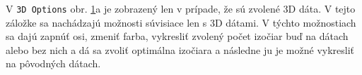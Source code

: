\documentclass[a4paper,11pt,oneside]{article}%
\begin{document}
V \texttt{3D Options} obr. \ref{fig:uidata2}a je zobrazený len v prípade, že sú zvolené 3D dáta. V tejto záložke sa nachádzajú možnosti súvisiace len s 3D dátami. V týchto možnostiach sa dajú zapnúť osi, zmeniť farba, vykresliť zvolený počet izočiar buď na dátach alebo bez nich a dá sa zvoliť optimálna izočiara a následne ju je možné vykresliť na pôvodných dátach. 

\begin{figure}[H]%
    \centering
    \qquad
    \caption{}%
    \label{fig:uidata2}%
\end{figure}
\end{document}
